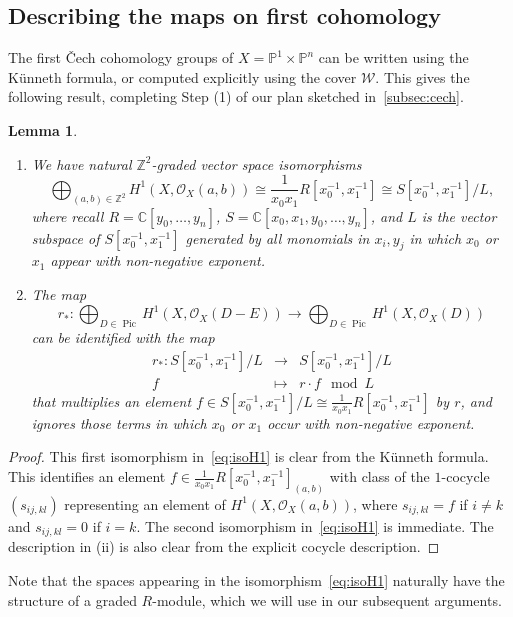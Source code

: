 \documentclass[a4paper,11pt]{amsart}
\theoremstyle{plain}
\newtheorem{lemma}[theorem]{Lemma}
\theoremstyle{definition}
\newcommand{\C}{\mathbb{C}}
\newcommand{\p}{\mathbb{P}}
\newcommand{\Z}{\mathbb{Z}}
\newcommand{\Ox}{\mathcal{O}}
\DeclareMathOperator{\Pic}{Pic}
\begin{document}
\subsection{Describing the maps on first cohomology}

The first \v Cech cohomology groups of $X=\p^1\times\p^n$ can be written using the Künneth formula, or computed explicitly using the cover $\mathcal{W}$. This gives the following result, completing Step (1) of 
our plan sketched in~\ref{subsec:cech}. 
\begin{lemma} \label{lem:H1}\begin{enumerate} \item[(i)] We have natural $\Z^2$-graded vector space isomorphisms 
\begin{equation}\label{eq:isoH1}
    \bigoplus_{(a,b) \in \Z^2} H^1(X,\Ox_X(a,b)) \cong \frac{1}{x_0 x_1}R[x_0^{-1}, x_1^{-1}] \cong S[x_0^{-1}, x_1^{-1}]/L,
\end{equation}
where recall $R=\C[y_0,\ldots, y_n]$, $S=\C[x_0,x_1, y_0,\ldots, y_n]$, and $L$ is the vector subspace of 
$S[x_0^{-1}, x_1^{-1}]$ generated by all monomials in $x_i, y_j$ in which $x_0$ or $x_1$ appear with non-negative exponent.
\item[(ii)] The map
\[
r_{*} : \displaystyle\bigoplus_{D\in\Pic} H^1(X, \Ox_X(D-E)) \longrightarrow \displaystyle\bigoplus_{D\in\Pic} H^1(X, \Ox_X(D))
\]
can be identified with the map 
\[\begin{array}{rcl}
r_{*} : S[x_0^{-1}, x_1^{-1}]/L & \longrightarrow & S[x_0^{-1}, x_1^{-1}]/L\\
f & \mapsto &  r \cdot f \mod L
\end{array}
\]
that multiplies an element $f\in S[x_0^{-1}, x_1^{-1}]/L\cong\frac{1}{x_0 x_1}R[x_0^{-1}, x_1^{-1}]$ by $r$, and ignores those terms in which $x_0$ or $x_1$ occur with non-negative exponent. 
\end{enumerate}
\end{lemma}
\begin{proof} This first isomorphism in~\eqref{eq:isoH1} is clear from the K\" unneth formula. This identifies an element $f \in \frac{1}{x_0 x_1}R[x_0^{-1}, x_1^{-1}]_{(a,b)}$ with class of the $1$-cocycle $(s_{ij,kl})$ representing an element of $H^1(X,\Ox_X(a,b))$, where $s_{ij,kl} = f$ if $i \neq k$ and $s_{ij,kl} = 0$ if $i = k$. The second isomorphism in~\eqref{eq:isoH1} is immediate. The description in (ii) is also clear from the explicit cocycle description. 
\end{proof}
Note that the spaces appearing in the isomorphism~\eqref{eq:isoH1} naturally have the structure of a graded $R$-module, which we will use in our subsequent arguments. 
\end{document}
